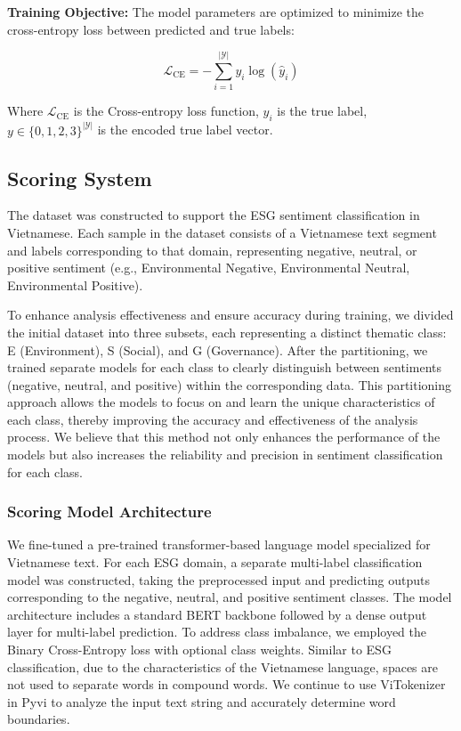 \documentclass[12pt, letterpaper]{template}
\begin{document}
{\bf Training Objective:}
The model parameters are optimized to minimize the cross-entropy loss between predicted and true labels:

\begin{equation}
\mathcal{L}_{\text{CE}} = -\sum_{i=1}^{|\mathcal{Y}|} y_i \log(\hat{y}_i)
\end{equation}

Where $\mathcal{L}_{\text{CE}}$ is the Cross-entropy loss function, $y_i$ is the true label, $y \in \{0,1,2,3\}^{|\mathcal{Y}|}$ is the encoded true label vector.

\subsection{Scoring System}

The dataset was constructed to support the ESG sentiment classification in Vietnamese. Each sample in the dataset consists of a Vietnamese text segment and labels corresponding to that domain, representing negative, neutral, or positive sentiment (e.g., Environmental Negative, Environmental Neutral, Environmental Positive).

To enhance analysis effectiveness and ensure accuracy during training, we divided the initial dataset into three subsets, each representing a distinct thematic class: E (Environment), S (Social), and G (Governance). After the partitioning, we trained separate models for each class to clearly distinguish between sentiments (negative, neutral, and positive) within the corresponding data. This partitioning approach allows the models to focus on and learn the unique characteristics of each class, thereby improving the accuracy and effectiveness of the analysis process. We believe that this method not only enhances the performance of the models but also increases the reliability and precision in sentiment classification for each class.

\subsubsection{Scoring Model Architecture}

We fine-tuned a pre-trained transformer-based language model specialized for Vietnamese text. For each ESG domain, a separate multi-label classification model was constructed, taking the preprocessed input and predicting outputs corresponding to the negative, neutral, and positive sentiment classes. The model architecture includes a standard BERT backbone followed by a dense output layer for multi-label prediction. To address class imbalance, we employed the Binary Cross-Entropy loss with optional class weights. Similar to ESG classification, due to the characteristics of the Vietnamese language, spaces are not used to separate words in compound words. We continue to use ViTokenizer in Pyvi to analyze the input text string and accurately determine word boundaries.
\end{document}
